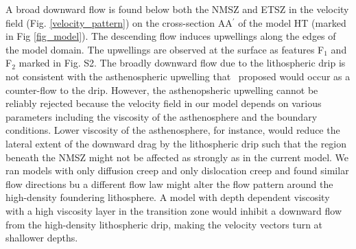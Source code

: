 \documentclass[draft,linenumbers]{agujournal2018}
\begin{document}
A broad downward flow is found below both the NMSZ and ETSZ in the velocity field (Fig. \ref{velocity_pattern}) on the cross-section AA$^{\prime}$ of the model HT (marked in Fig \ref{fig_model}). The descending flow induces upwellings along the edges of the model domain. The upwellings are observed at the surface as features F$_1$ and F$_2$ marked in Fig. S2. The broadly downward flow due to the lithospheric drip is not consistent with the asthenospheric upwelling that~\citet{Biryol_2016} proposed would occur as a counter-flow to the drip. However, the asthenopsheric upwelling cannot be reliably rejected because the velocity field in our model depends on various parameters including the viscosity of the asthenosphere and the boundary conditions. Lower viscosity of the asthenosphere, for instance, would reduce the lateral extent of the downward drag by the lithospheric drip such that the region beneath the NMSZ might not be affected as strongly as in the current model. We ran models with only diffusion creep and only dislocation creep and found similar flow directions  bu a different flow law might alter the flow pattern around the high-density foundering lithosphere. A model with depth dependent viscosity with a high viscosity layer in the transition zone would inhibit a downward flow from the high-density lithospheric drip, making the velocity vectors turn at shallower depths.
\end{document}
